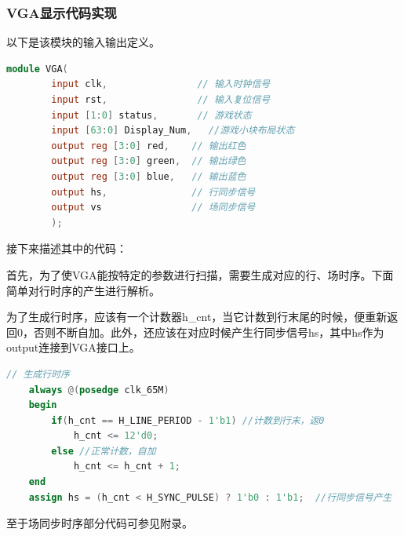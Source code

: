 \documentclass[UTF8]{article}
\newcommand{\jumpline} {\hspace*{\fill} \par}
\begin{document}
	\subsubsection{VGA显示代码实现}
	以下是该模块的输入输出定义。\par
	\begin{lstlisting}[language=Verilog]
	module VGA( 
		input clk,                // 输入时钟信号
		input rst,                // 输入复位信号
		input [1:0] status,       // 游戏状态
		input [63:0] Display_Num,	//游戏小块布局状态
		output reg [3:0] red,    // 输出红色
		output reg [3:0] green,  // 输出绿色
		output reg [3:0] blue,   // 输出蓝色
		output hs,               // 行同步信号
		output vs                // 场同步信号
		);
	\end{lstlisting}\par
	接下来描述其中的代码：\par
	首先，为了使VGA能按特定的参数进行扫描，需要生成对应的行、场时序。下面简单对行时序的产生进行解析。\par
	为了生成行时序，应该有一个计数器h\_cnt，当它计数到行末尾的时候，便重新返回0，否则不断自加。此外，还应该在对应时候产生行同步信号hs，其中hs作为output连接到VGA接口上。\par
	\begin{lstlisting}[language=Verilog]
	// 生成行时序
	always @(posedge clk_65M)
	begin
		if(h_cnt == H_LINE_PERIOD - 1'b1) //计数到行末，返0
			h_cnt <= 12'd0;
		else //正常计数，自加
			h_cnt <= h_cnt + 1;
	end
	assign hs = (h_cnt < H_SYNC_PULSE) ? 1'b0 : 1'b1;  //行同步信号产生
	\end{lstlisting}\par
	至于场同步时序部分代码可参见附录。\par
	\jumpline
	
\end{document}
